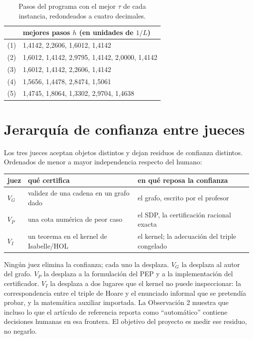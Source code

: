\documentclass[11pt,a4paper]{article}
\begin{document}
\begin{table}[!ht]
\centering
\footnotesize
\setlength{\tabcolsep}{4pt}
\begin{tabular}{@{}ll@{}}
\toprule
& mejores pasos $h$ (en unidades de $1/L$) \\
\midrule
(1) & 1{,}4142, 2{,}2606, 1{,}6012, 1{,}4142 \\
(2) & 1{,}6012, 1{,}4142, 2{,}9795, 1{,}4142, 2{,}0000, 1{,}4142 \\
(3) & 1{,}6012, 1{,}4142, 2{,}2606, 1{,}4142 \\
(4) & 1{,}5656, 1{,}4478, 2{,}8474, 1{,}5061 \\
(5) & 1{,}4745, 1{,}8064, 1{,}3302, 2{,}9704, 1{,}4638 \\
\bottomrule
\end{tabular}
\caption{Pasos del programa con el mejor $\tau$ de cada instancia, redondeados a cuatro decimales.}
\label{tab:pasos}
\end{table}

\section{Jerarquía de confianza entre jueces}

Los tres jueces aceptan objetos distintos y dejan residuos de confianza distintos. Ordenados de menor a mayor independencia respecto del humano:

\begin{center}
\begin{tabular}{@{}lll@{}}
\toprule
juez & qué certifica & en qué reposa la confianza \\
\midrule
$V_G$ & validez de una cadena en un grafo dado & el grafo, escrito por el profesor \\
$V_P$ & una cota numérica de peor caso & el SDP, la certificación racional exacta \\
$V_I$ & un teorema en el kernel de Isabelle/HOL & el kernel; la adecuación del triple congelado \\
\bottomrule
\end{tabular}
\end{center}

Ningún juez elimina la confianza; cada uno la desplaza. $V_G$ la desplaza al autor del grafo. $V_P$ la desplaza a la formulación del PEP y a la implementación del certificador. $V_I$ la desplaza a dos lugares que el kernel no puede inspeccionar: la correspondencia entre el triple de Hoare y el enunciado informal que se pretendía probar, y la matemática auxiliar importada. La Observación 2 muestra que incluso lo que el artículo de referencia reporta como ``automático'' contiene decisiones humanas en esa frontera. El objetivo del proyecto es medir ese residuo, no negarlo.
\end{document}
